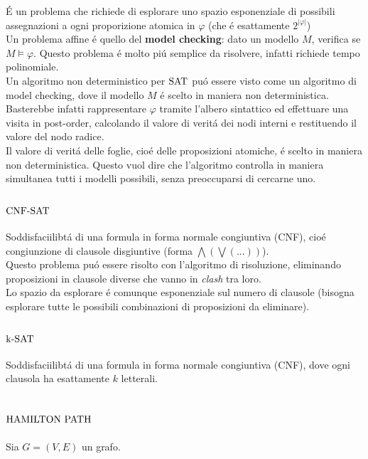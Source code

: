 É un problema che richiede di esplorare uno spazio esponenziale di possibili assegnazioni a ogni proporizione atomica in $\varphi$
(che é esattamente $2^{|\varphi|}$)\\
Un problema affine é quello del \textbf{model checking}: dato un modello $M$, verifica se $M \models \varphi$.
Questo problema é molto piú semplice da risolvere, infatti richiede tempo polinomiale. \\
Un algoritmo non deterministico per $\text{SAT}$ puó essere visto come un algoritmo di model checking, 
dove il modello $M$ é scelto in maniera non deterministica. \\
Basterebbe infatti rappresentare $\varphi$ tramite l'albero sintattico ed effettuare una visita in post-order,
calcolando il valore di veritá dei nodi interni e restituendo il valore del nodo radice. \\
Il valore di veritá delle foglie, cioé delle proposizioni atomiche, é scelto in maniera non deterministica. 
Questo vuol dire che l'algoritmo controlla in maniera simultanea tutti i modelli possibili,
senza preoccuparsi di cercarne uno.

\subsubsection{$\text{CNF-SAT}$}
Soddisfaciilibtá di una formula in forma normale congiuntiva (CNF), cioé congiunzione di clausole disgiuntive (forma $\bigwedge(\bigvee(...))$). \\
Questo problema puó essere risolto con l'algoritmo di risoluzione, eliminando proposizioni in clausole diverse che vanno in 
\textit{clash} tra loro. \\
Lo spazio da esplorare é comunque esponenziale sul numero di clausole (bisogna esplorare tutte le possibili combinazioni di proposizioni da eliminare). \\

\subsubsection{$\text{k-SAT}$}
Soddisfaciilibtá di una formula in forma normale congiuntiva (CNF), dove ogni clausola ha esattamente $k$ letterali.


\subsection{$\text{HAMILTON PATH}$}
\label{problema:hamiltonpath}
Sia $G = (V, E)$ un grafo.

